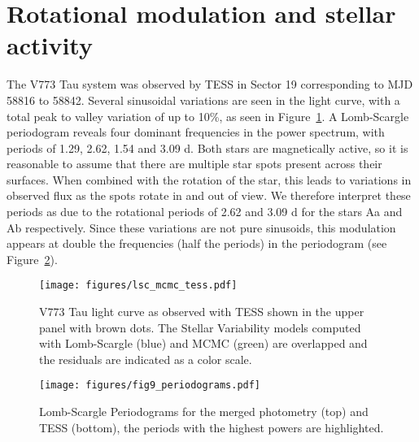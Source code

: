 \documentclass{aa}
\begin{document}
\section{Rotational modulation and stellar activity} \label{sec:variability}



The V773 Tau system was observed by TESS in Sector 19 corresponding to MJD 58816 to 58842.
%
Several sinusoidal variations are seen in the light curve, with a total peak to valley variation of up to 10\%, as seen in Figure~\ref{fig:tess_variability}.
%
A Lomb-Scargle periodogram reveals four dominant frequencies in the power spectrum, with periods of 1.29, 2.62, 1.54 and 3.09 d.
%
Both stars are magnetically active, so it is reasonable to assume that there are multiple star spots present across their surfaces.
%
When combined with the rotation of the star, this leads to variations in observed flux as the spots rotate in and out of view.
%
We therefore interpret these periods as due to the rotational periods of 2.62 and 3.09 d for the stars Aa and Ab respectively. 
%
Since these variations are not pure sinusoids, this modulation appears at double the frequencies (half the periods) in the periodogram (see Figure~\ref{fig:two_periodograms}).

\begin{figure}
\begin{center}
    \centering
    \texttt{[image: figures/lsc\_mcmc\_tess.pdf]}
    \caption{V773 Tau light curve as observed with TESS shown in the upper panel with brown dots.
    The Stellar Variability models computed with Lomb-Scargle (blue) and MCMC (green) are overlapped and the residuals are indicated as a color scale.}
\label{fig:tess_variability}
\end{center}
\end{figure}

\begin{figure}[ht]
    \centering
    \texttt{[image: figures/fig9\_periodograms.pdf]}
    \caption{Lomb-Scargle Periodograms for the merged photometry (top) and TESS (bottom), the periods with the highest powers are highlighted.}
    \label{fig:two_periodograms}
\end{figure}
\end{document}

